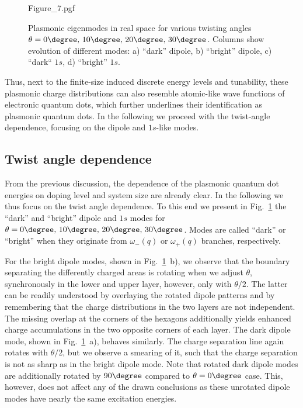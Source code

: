\vspace{-0.3cm}\begin{figure}[h]
    \centering
    {Figure_7.pgf}
    \caption{Plasmonic eigenmodes in real space for various twisting angles $\theta=0\degree,\,10\degree,\,20\degree,\,30\degree$. Columns show evolution of different modes: a) ``dark'' dipole, b) ``bright'' dipole, c) ``dark`` $1s$, d) ``bright'' $1s$.}
    \label{fig:mat22:modesTheta}
\end{figure}

\vspace{-0.1cm}Thus, next to the finite-size induced discrete energy levels and tunability, these plasmonic charge distributions can also resemble atomic-like wave functions of electronic quantum dots, which further underlines their identification as plasmonic quantum dots. In the following we proceed with the twist-angle dependence, focusing on the dipole and $1s$-like modes.

\subsection{Twist angle dependence}

From the previous discussion, the dependence of the plasmonic quantum dot energies on doping level and system size are already clear. In the following we thus focus on the twist angle dependence. To this end we present in Fig.~\ref{fig:mat22:modesTheta} the ``dark'' and ``bright'' dipole and $1s$ modes for $\theta=0\degree, \,10\degree, \,20\degree, \,30\degree$. Modes are called ``dark'' or ``bright'' when they originate from $\omega_-(q)$ or $\omega_+(q)$ branches, respectively.

For the bright dipole modes, shown in Fig.~\ref{fig:mat22:modesTheta}~b), we observe that the boundary separating the differently charged areas is rotating when we adjust $\theta$, synchronously in the lower and upper layer, however, only with $\theta/2$. The latter can be readily understood by overlaying the rotated dipole patterns and by remembering that the charge distributions in the two layers are not independent. The missing overlap at the corners of the hexagons additionally yields enhanced charge accumulations in the two opposite corners of each layer. The dark dipole mode, shown in Fig.~\ref{fig:mat22:modesTheta}~a), behaves similarly. The charge separation line again rotates with $\theta/2$, but we observe a smearing of it, such that the charge separation is not as sharp as in the bright dipole mode. Note that rotated dark dipole modes are additionally rotated by $90\degree$ compared to $\theta=0\degree$ case. This, however, does not affect any of the drawn conclusions as these unrotated dipole modes have nearly the same excitation energies.%

